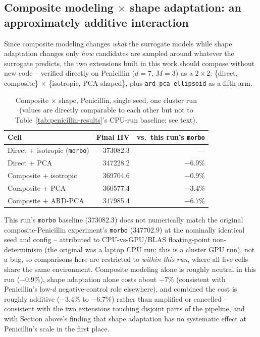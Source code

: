 \documentclass[11pt]{article}
\begin{document}
\subsection{Composite modeling $\times$ shape adaptation: an approximately additive interaction}

Since composite modeling changes \emph{what} the surrogate models while
shape adaptation changes only \emph{how} candidates are sampled around
whatever the surrogate predicts, the two extensions built in this work
should compose without new code -- verified directly on Penicillin
($d{=}7$, $M{=}3$) as a $2\times2$: \{direct, composite\} $\times$
\{isotropic, PCA-shaped\}, plus \texttt{ard\_pca\_ellipsoid} as a fifth arm.

\begin{table}[h]
\centering
\caption{Composite $\times$ shape, Penicillin, single seed, one cluster run
(values are directly comparable to each other but not to
Table~\ref{tab:penicillin-results}'s CPU-run baseline; see text).}
\label{tab:tr-shape-composite-2x2}
\begin{tabular}{lrr}
\toprule
Cell & Final HV & vs.\ this run's \texttt{morbo} \\
\midrule
Direct + isotropic (\texttt{morbo}) & 373082.3 & --- \\
Direct + PCA & 347228.2 & $-6.9\%$ \\
Composite + isotropic & 369704.6 & $-0.9\%$ \\
Composite + PCA & 360577.4 & $-3.4\%$ \\
Composite + ARD-PCA & 347985.4 & $-6.7\%$ \\
\bottomrule
\end{tabular}
\end{table}

This run's \texttt{morbo} baseline ($373082.3$) does not numerically match
the original composite-Penicillin experiment's \texttt{morbo}
($347702.9$) at the nominally identical seed and config -- attributed to
CPU-vs-GPU/BLAS floating-point non-determinism (the original was a laptop
CPU run; this is a cluster GPU run), not a bug, so comparisons here are
restricted to \emph{within this run}, where all five cells share the same
environment. Composite modeling alone is roughly neutral in this run
($-0.9\%$), shape adaptation alone costs about $-7\%$ (consistent with
Penicillin's low-$d$ negative-control role elsewhere), and combined the
cost is roughly additive ($-3.4\%$ to $-6.7\%$) rather than amplified or
cancelled -- consistent with the two extensions touching disjoint parts of
the pipeline, and with Section above's finding that shape adaptation has no
systematic effect at Penicillin's scale in the first place.
\end{document}

